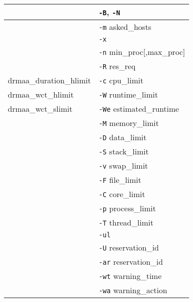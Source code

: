 \documentclass[a4paper,10pt,english]{article}
\newlength{\DUtablewidth} %
\begin{document}
\begin{longtable}[c]{|p{0.261\DUtablewidth}|p{0.307\DUtablewidth}|}
% 
 & 
\texttt{-B}, \texttt{-N}
 \\
\hline

% 
 & 
\texttt{-m} asked\_hosts
 \\
\hline

% 
 & 
\texttt{-x}
 \\
\hline

% 
 & 
\texttt{-n} min\_proc{[},max\_proc{]}
 \\
\hline

% 
 & 
\texttt{-R} res\_req
 \\
\hline

drmaa\_duration\_hlimit
 & 
\texttt{-c} cpu\_limit
 \\
\hline

drmaa\_wct\_hlimit
 & 
\texttt{-W} runtime\_limit
 \\
\hline

drmaa\_wct\_slimit
 & 
\texttt{-We} estimated\_runtime
 \\
\hline

% 
 & 
\texttt{-M} memory\_limit
 \\
\hline

% 
 & 
\texttt{-D} data\_limit
 \\
\hline

% 
 & 
\texttt{-S} stack\_limit
 \\
\hline

% 
 & 
\texttt{-v} swap\_limit
 \\
\hline

% 
 & 
\texttt{-F} file\_limit
 \\
\hline

% 
 & 
\texttt{-C} core\_limit
 \\
\hline

% 
 & 
\texttt{-p} process\_limit
 \\
\hline

% 
 & 
\texttt{-T} thread\_limit
 \\
\hline

% 
 & 
\texttt{-ul}
 \\
\hline

% 
 & 
\texttt{-U} reservation\_id
 \\
\hline

% 
 & 
\texttt{-ar} reservation\_id
 \\
\hline

% 
 & 
\texttt{-wt} warning\_time
 \\
\hline

% 
 & 
\texttt{-wa} warning\_action
 \\
\hline


\end{longtable}
\end{document}
